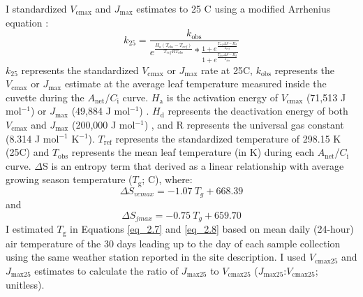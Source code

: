 I standardized $V_\mathrm{cmax}$ and $J_\mathrm{max}$ estimates to 25 \textdegree{}C using a modified Arrhenius equation :
\begin{equation} \label{eq_2.6}
    k_\mathrm{25}=\frac{k_\mathrm{obs}}{e^{\frac{H_a(T_{obs}-T_{ref})}{T_{ref}RT_{obs}}}*\frac{1+e^{\frac{T_{ref}\Delta S-H_d}{T_{ref}}}}{1+e^{\frac{T_{obs}\Delta S-H_d}{T_{obs}}}}}
\end{equation}
\noindent $k_\mathrm{25}$ represents the standardized $V_\mathrm{cmax}$ or $J_\mathrm{max}$ rate at 25\textdegree{}C, $k_\mathrm{obs}$ represents the $V_\mathrm{cmax}$ or $J_\mathrm{max}$ estimate at the average leaf temperature measured inside the cuvette during the $A_\mathrm{net}$/$C_\mathrm{i}$ curve. $H_\mathrm{a}$ is the activation energy of $V_{\mathrm{cmax}}$ (71,513 J mol$^{-1}$)  or $J_\mathrm{max}$ (49,884 J mol$^{-1}$) . $H_\mathrm{d}$ represents the deactivation energy of both $V_\mathrm{cmax}$ and $J_\mathrm{max}$ (200,000 J mol$^{-1}$) , and R represents the universal gas constant (8.314 J mol$^{-1}$ K$^{-1}$). $T_\mathrm{ref}$ represents the standardized temperature of 298.15 K (25\textdegree{}C) and $T_\mathrm{obs}$ represents the mean leaf temperature (in K) during each $A_\mathrm{net}$/$C_\mathrm{i}$ curve. $\Delta$S is an entropy term that  derived as a linear relationship with average growing season temperature ($T_\mathrm{g}$; \textdegree{}C), where: 
\begin{equation} \label{eq_2.7}
    \Delta S_{vcmax}=-1.07\ T_{g}+668.39
\end{equation} 
\noindent and
\begin{equation} \label{eq_2.8}
    \Delta S_{jmax}=-0.75\ T_{g}+659.70
\end{equation}
\noindent I estimated $T_\mathrm{g}$ in Equations \ref{eq_2.7} and \ref{eq_2.8} based on mean daily (24-hour) air temperature of the 30 days leading up to the day of each sample collection using the same weather station reported in the site description. I used $V_\mathrm{cmax25}$ and $J_\mathrm{max25}$ estimates to calculate the ratio of $J_\mathrm{max25}$ to $V_\mathrm{cmax25}$ ($J_\mathrm{max25}$:$V_\mathrm{cmax25}$; unitless).

